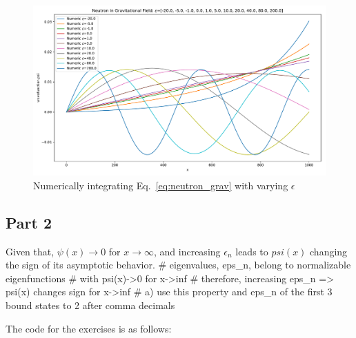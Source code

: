 \documentclass[12pt,a4paper,twoside]{article}
\begin{document}
\begin{figure}[h!]
  \centering
  \includegraphics[width=.9\textwidth]{../exercise4_problem2_varyEps.pdf}
  \caption{Numerically integrating Eq.~\ref{eq:neutron_grav} with varying $\epsilon$}
  \label{fig:2b}
\end{figure}



\subsection*{Part 2}

Given that, $\psi(x) \rightarrow 0$ for $x \rightarrow \infty$, 
and increasing $\epsilon_n$ leads to $psi(x)$ changing the sign of its asymptotic
behavior. 
# eigenvalues, eps_n, belong to normalizable eigenfunctions
# with psi(x)->0 for x->inf
# therefore, increasing eps_n => psi(x) changes sign for x->inf
# a) use this property and eps_n of the first 3 bound states to 2 after comma decimals



%
The code for the exercises is as follows:

\end{document}
